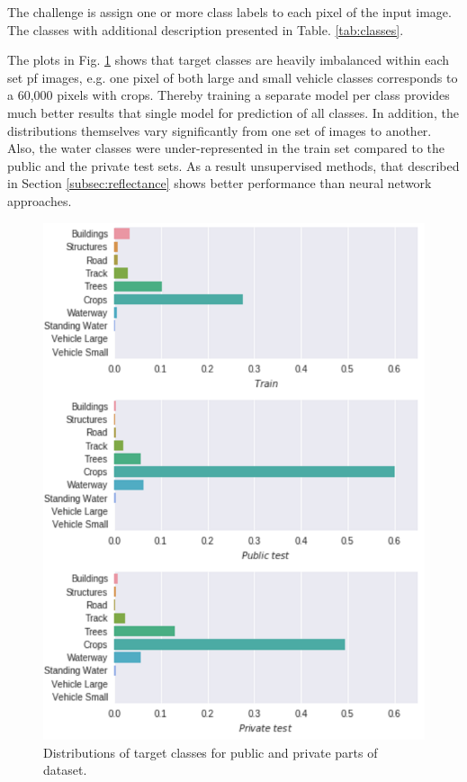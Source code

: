 \documentclass[10pt,twocolumn,letterpaper]{article}
\begin{document}
The challenge is assign one or more class labels to each pixel of the input image. The classes with additional description presented in Table. \ref{tab:classes}. 

The plots in Fig. \ref{fig:cls_distr} shows that target classes are heavily imbalanced within each set pf images, e.g. one pixel of both large and small vehicle classes corresponds to a 60,000 pixels with crops. Thereby training a separate model per class provides much better results that single model for prediction of all classes. In addition, the distributions themselves vary significantly from one set of images to another. Also, the water classes were under-represented in the train set compared to the public and the private test sets. As a result unsupervised methods, that described in Section \ref{subsec:reflectance} shows better performance than neural network approaches. 

\begin{figure}[!h]
	\captionsetup{justification=centering}
	\centering
	\includegraphics[scale=0.4]{class_distrib}
	\caption{ Distributions of target classes for public and private parts of dataset.}
	\label{fig:cls_distr}
\end{figure}
\end{document}
